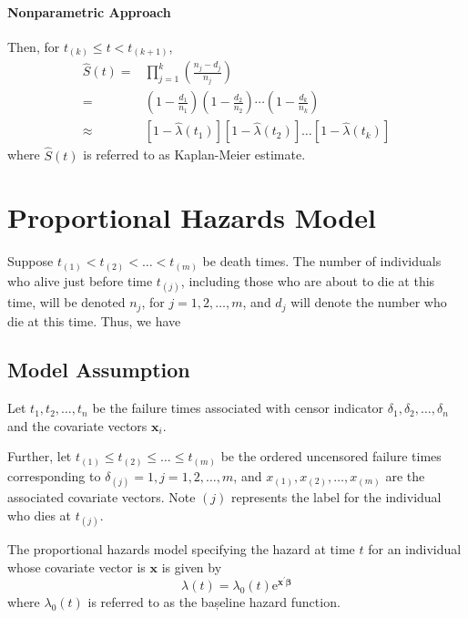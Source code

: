 \paragraph*{Nonparametric Approach}

Then, for $t_{(k)}\leq t<t_{(k+1)}$,
\begin{equation}
    \begin{aligned}
        \hat{S}(t)= & \prod_{j=1}^{k}\left(\frac{n_{j}-d_{j}}{n_{j}}\right)                                                                                             \\
        =           & \left(1-\frac{d_{1}}{n_{1}}\right)\left(1-\frac{d_{2}}{n_{2}}\right) \cdots\left(1-\frac{d_{k}}{n_{k}}\right)                                     \\
        \approx     & \left[1-\hat{\lambda}\left(t_{1}\right)\right]\left[1-\hat{\lambda}\left(t_{2}\right)\right] \ldots\left[1-\hat{\lambda}\left(t_{k}\right)\right]
    \end{aligned}
\end{equation}
where $\hat{S}(t)$ is referred to as Kaplan-Meier estimate.

\section{Proportional Hazards Model}

Suppose $t_{(1)}<t_{(2)}<\ldots<t_{(m)}$ be death times. The number of
individuals who alive just before time $t_{(j)}$, including those who are about to die at this time, will be denoted $n_{j}$, for $j=1,2,\ldots,m$, and $d_{j}$ will denote the number who die at this time. Thus, we have

\subsection{Model Assumption}

Let $t_{1},t_{2},\ldots,t_{n}$ be the failure times associated with censor indicator $\delta_{1},\delta_{2},\ldots,\delta_{n}$ and the covariate vectors $\mathbf{x}_{i}$.

Further, let $t_{(1)}\leq t_{(2)}\leq\ldots\leq t_{(m)}$ be the ordered uncensored failure times corresponding to $\delta_{(j)}=1,j=1,2,\ldots,m$, and $x_{(1)},x_{(2)},\ldots,x_{(m)}$ are the associated covariate vectors. Note $(j)$ represents the label for the individual who dies at $t_{(j)}$.

The proportional hazards model specifying the hazard at time $t$ for an individual whose covariate vector is $\mathbf{x}$ is given by
\begin{equation}
    \lambda(t)=\lambda_{0}(t)\mathrm{e}^{\mathbf{x}^{\prime}\boldsymbol{\beta}}
\end{equation}
where $\lambda_{0}(t)$ is referred to as the bașeline hazard function.

